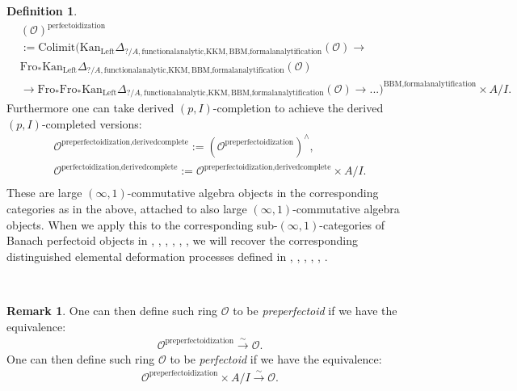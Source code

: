 \documentclass[11pt]{book}
\theoremstyle{definition}
\newtheorem{definition}[theorem]{Definition}
\newtheorem{remark}[theorem]{Remark}
\numberwithin{equation}{section}
\begin{document}
\begin{definition}
\begin{align}
&(\mathcal{O})^{\text{perfectoidization}}\\
&:=\mathrm{Colimit}(\mathrm{Kan}_{\mathrm{Left}}\Delta_{?/A,\text{functionalanalytic,KKM},\text{BBM,formalanalytification}}(\mathcal{O})\longrightarrow \\
&\mathrm{Fro}_*\mathrm{Kan}_{\mathrm{Left}}\Delta_{?/A,\text{functionalanalytic,KKM},\text{BBM,formalanalytification}}(\mathcal{O})\\
&\longrightarrow \mathrm{Fro}_* \mathrm{Fro}_*\mathrm{Kan}_{\mathrm{Left}}\Delta_{?/A,\text{functionalanalytic,KKM},\text{BBM,formalanalytification}}(\mathcal{O})\longrightarrow...)^{\text{BBM,formalanalytification}}\times A/I.	
\end{align}
Furthermore one can take derived $(p,I)$-completion to achieve the derived $(p,I)$-completed versions:
\begin{align}
\mathcal{O}^\text{preperfectoidization,derivedcomplete}:=(\mathcal{O}^\text{preperfectoidization})^{\wedge},\\
\mathcal{O}^\text{perfectoidization,derivedcomplete}:=\mathcal{O}^\text{preperfectoidization,derivedcomplete}\times A/I.\\
\end{align}
These are large $(\infty,1)$-commutative algebra objects in the corresponding categories as in the above, attached to also large $(\infty,1)$-commutative algebra objects. When we apply this to the corresponding sub-$(\infty,1)$-categories of Banach perfectoid objects in \cite{BMS2}, \cite{GR}, \cite{12KL1}, \cite{12KL2}, \cite{12Ked1}, \cite{12Sch3},  we will recover the corresponding distinguished elemental deformation processes defined in \cite{BMS2}, \cite{GR}, \cite{12KL1}, \cite{12KL2}, \cite{12Ked1}, \cite{12Sch3}.
\end{definition}

\

\begin{remark}
One can then define such ring $\mathcal{O}$ to be \textit{preperfectoid} if we have the equivalence:
\begin{align}
\mathcal{O}^{\text{preperfectoidization}} \overset{\sim}{\longrightarrow}	\mathcal{O}.
\end{align}
One can then define such ring $\mathcal{O}$ to be \textit{perfectoid} if we have the equivalence:
\begin{align}
\mathcal{O}^{\text{preperfectoidization}}\times A/I \overset{\sim}{\longrightarrow}	\mathcal{O}.
\end{align}
	
\end{remark}
\end{document}
